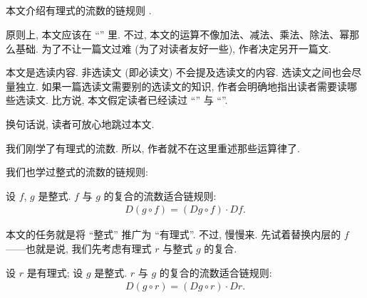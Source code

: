 \subsection*{\ChainRuleOfFluxionsOfRationalExpressions}
\markright{\ChainRuleOfFluxionsOfRationalExpressions}

本文介绍有理式的流数的链规则 .

原则上, 本文应该在 ``\OperationsOnRationalExprsssions'' 里. 不过, 本文的运算不像加法、减法、乘法、除法、幂那么基础. 为了不让一篇文过难 (为了对读者友好一些), 作者决定另开一篇文.

本文是选读内容. 非选读文 (即必读文) 不会提及选读文的内容. 选读文之间也会尽量独立. 如果一篇选读文需要别的选读文的知识, 作者会明确地指出读者需要读哪些选读文. 比方说, 本文假定读者已经读过 ``\CompositionOfRationalExpressions'' 与 ``\FluxionsOfRationalExpressions''.

换句话说, 读者可放心地跳过本文.

\myLine

我们刚学了有理式的流数. 所以, 作者就不在这里重述那些运算律了.

我们也学过整式的流数的链规则:

\begin{proposition}
    设 $f$, $g$ 是整式. $f$ 与 $g$ 的复合的流数适合链规则:
    \begin{align*}
        D(g \circ f) = (Dg \circ f) \cdot Df.
    \end{align*}
\end{proposition}

本文的任务就是将 ``整式'' 推广为 ``有理式''. 不过, 慢慢来. 先试着替换内层的 $f$——也就是说, 我们先考虑有理式 $r$ 与整式 $g$ 的复合.

\begin{proposition}
    设 $r$ 是有理式; 设 $g$ 是整式. $r$ 与 $g$ 的复合的流数适合链规则:
    \begin{align*}
        D(g \circ r) = (Dg \circ r) \cdot Dr.
    \end{align*}
\end{proposition}

